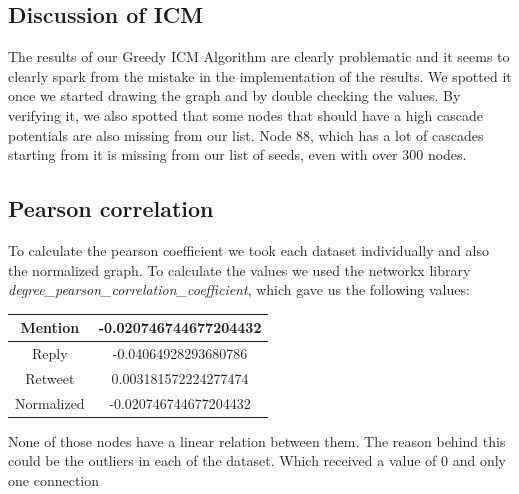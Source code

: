 \subsection{Discussion of ICM}

The results of our Greedy ICM Algorithm are clearly problematic and it seems to clearly spark from the mistake in the implementation of the results. We spotted it once we started drawing the graph and by double checking the values. By verifying it, we also spotted that some nodes that should have a high cascade potentials are also missing from our list. Node 88, which has a lot of cascades starting from it is missing from our list of seeds, even with over 300 nodes.

\subsection{Pearson correlation}
To calculate the pearson coefficient we took each dataset individually and also the normalized graph.
To calculate the values we used the networkx library \textit{degree\_pearson\_correlation\_coefficient}, which gave us the following values:
\begin{center}
 \begin{tabular}{||c | c ||} 
 \hline
 Mention & -0.020746744677204432 \\
 \hline
 Reply & -0.04064928293680786\\ 
 \hline
 Retweet & 0.003181572224277474\\ 
 \hline
 Normalized & -0.020746744677204432 \\ 
 \hline
\end{tabular}
\end{center}
None of those nodes have a linear relation between them. The reason behind this could be the outliers in each of the dataset. Which received a value of 0 and only one connection
